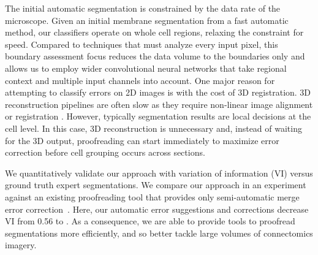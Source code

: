 The initial automatic segmentation is constrained by the data rate of the microscope. Given an initial membrane segmentation from a fast automatic method, our classifiers operate on whole cell regions, relaxing the constraint for speed. Compared to techniques that must analyze every input pixel, this boundary assessment focus reduces the data volume to the boundaries only and allows us to employ wider convolutional neural networks that take regional context and multiple input channels into account. One major reason for attempting to classify errors on 2D images is with the cost of 3D registration. 3D reconstruction pipelines are often slow as they require non-linear image alignment or registration \cite{akselrod09,Saalfeld2010Asrigidaspossible}. However, typically segmentation results are local decisions at the cell level. In this case, 3D reconstruction is unnecessary and, instead of waiting for the 3D output, proofreading can start immediately to maximize error correction before cell grouping occurs across sections.

We quantitatively validate our approach with variation of information (VI) versus ground truth expert segmentations. We compare our approach in an experiment against an existing proofreading tool that provides only semi-automatic merge error correction~\cite{haehn_dojo_2014}. Here, our automatic error suggestions and corrections decrease VI from 0.56 to . As a consequence, we are able to provide tools to proofread segmentations more efficiently, and so better tackle large volumes of connectomics imagery.

%
%
